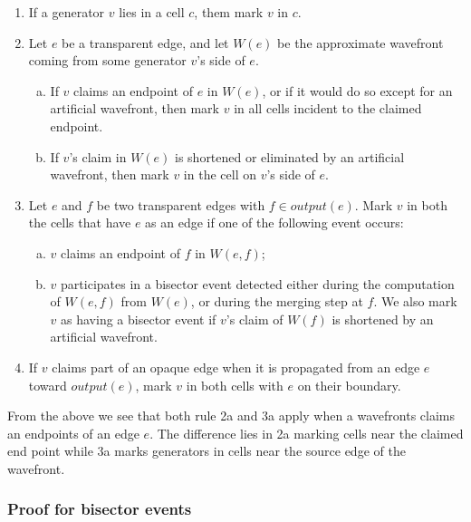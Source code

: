 \begin{enumerate}
\item If a generator $v$ lies in a cell $c$, them mark $v$ in $c$.
\item Let $e$ be a transparent edge, and let $W(e)$ be the approximate wavefront coming from 
	  some generator $v$'s side of $e$.
      \begin{enumerate}[a.]
      \item If $v$ claims an endpoint of $e$ in $W(e)$, or if it would do so except for an 
            artificial wavefront, then mark $v$ in all cells incident to the claimed endpoint.
      \item If $v$'s claim in $W(e)$ is shortened or eliminated by an artificial wavefront, 
      		then mark $v$ in the cell on $v$'s side of $e$.
      \end{enumerate}
\item Let $e$ and $f$ be two transparent edges with $f \in output(e)$. Mark $v$ in both the 
	  cells that have $e$ as an edge if one of the following event occurs:
      \begin{enumerate}[a.]
      \item $v$ claims an endpoint of $f$ in $W(e,f)$;
      \item $v$ participates in a bisector event detected either during the computation of 
      		$W(e,f)$ from $W(e)$, or during the merging step at $f$. We also mark $v$ as 
            having a bisector event if $v$'s claim of $W(f)$ is shortened by an artificial 
            wavefront.
      \end{enumerate}
\item If $v$ claims part of an opaque edge when it is propagated from an edge $e$ toward 
	  $output(e)$, mark $v$ in both cells with $e$ on their boundary.
\end{enumerate}

From the above we see that both rule 2a and 3a apply when a wavefronts claims an endpoints of 
an edge $e$. The difference lies in 2a marking cells near the claimed end point while 3a  
marks generators in cells near the source edge of the wavefront.


\subsubsection{Proof for bisector events}

